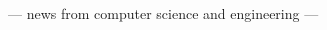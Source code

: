 \documentclass[twoside]{article}
\date{18--20 March 2016}
\begin{document}
\begingroup\maketitle
\centering\par
{\sffamily\fontsize{26pt}{26pt}\selectfont --- news from computer science and engineering ---}
\endgroup\vspace*{-1em}
\begin{multicols}{2}

\end{multicols}
\newpage
\end{document}
